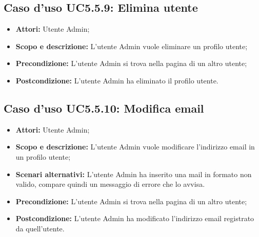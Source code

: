 \documentclass[12pt,a4paper,titlepage]{article}
\begin{document}
\subsection{Caso d'uso UC5.5.9: Elimina utente}
\begin{itemize}
	\item \textbf{Attori: }Utente Admin;
	\item \textbf{Scopo e descrizione: }L'utente Admin vuole eliminare un profilo utente;
	\item \textbf{Precondizione: }L'utente Admin si trova nella pagina di un altro utente;
	\item \textbf{Postcondizione: }L'utente Admin ha eliminato il profilo utente.
\end{itemize}
\subsection{Caso d'uso UC5.5.10: Modifica email}
\begin{itemize}
	\item \textbf{Attori: }Utente Admin;
	\item \textbf{Scopo e descrizione: }L'utente Admin vuole modificare l'indirizzo email in un profilo utente;
	\item \textbf{Scenari alternativi: }L'utente Admin ha inserito una mail in formato non valido, compare quindi un messaggio di errore che lo avvisa.
	\item \textbf{Precondizione: }L'utente Admin si trova nella pagina di un altro utente;
	\item \textbf{Postcondizione: }L'utente Admin ha modificato l'indirizzo email registrato da quell'utente.
\end{itemize}
\end{document}
